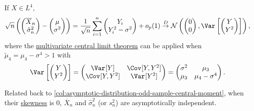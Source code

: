 \begin{proposition}\label{prop:joint-asymptotic-distribution-sample-mean-variance}
	If \(X \in L^4\),
	\[
		\sqrt{n} \left( \begin{pmatrix}
				\overline{X} _n   \\
				\hat{\sigma} _n^2 \\
			\end{pmatrix} - \begin{pmatrix}
				\mu       \\
				\sigma ^2 \\
			\end{pmatrix} \right)
		= \frac{1}{\sqrt{n} } \sum_{i=1}^{n} \begin{pmatrix}
			Y_i               \\
			Y_i^2 - \sigma ^2 \\
		\end{pmatrix} + o_p(1)
		\overset{D}{\to} \mathcal{N} \left( \begin{pmatrix}
			0 \\
			0 \\
		\end{pmatrix}, \Var_{}\left[\begin{pmatrix}
				Y   \\
				Y^2 \\
			\end{pmatrix} \right] \right),
	\]
	where the \hyperref[thm:multivariate-CLT]{multivariate central limit theorem} can be applied when \(\widetilde{\mu} _4 = \mu _4 - \sigma ^4 > 1\) with
	\[
		\Var_{}\left[\begin{pmatrix}
				Y   \\
				Y^2 \\
			\end{pmatrix} \right]
		= \begin{pmatrix}
			\Var_{}[Y]      & \Cov_{}[Y, Y^2] \\
			\Cov_{}[Y, Y^2] & \Var_{}[Y^2]    \\
		\end{pmatrix}
		= \begin{pmatrix}
			\sigma ^2 & \mu _3             \\
			\mu _3    & \mu _4 - \sigma ^4 \\
		\end{pmatrix}.
	\]
\end{proposition}

\begin{remark}
	Related back to \autoref{col:asymptotic-distribution-odd-sample-central-moment}, when their \hyperref[def:skewness]{skewness} is \(0\), \(\overline{X} _n\) and \(\hat{\sigma} _n^2\) (or \(s_n^2\)) are asymptotically independent.
\end{remark}

